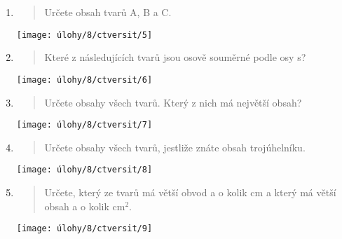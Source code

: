 \begin{enumerate}
\begin{minipage}[t]{\linewidth}
    \end{minipage}

    \item
    \begin{minipage}[t]{\linewidth}
        \begin{quote}
            Určete obsah tvarů A, B a C\@.
        \end{quote}
        \centering
        \texttt{[image: úlohy/8/ctversit/5]}

    \end{minipage}

    \item
    \begin{minipage}[t]{\linewidth}
        \begin{quote}
            Které z následujících tvarů jsou osově souměrné podle osy s?
        \end{quote}
        \centering
        \texttt{[image: úlohy/8/ctversit/6]}

    \end{minipage}

    \item
    \begin{minipage}[t]{\linewidth}
        \begin{quote}
            Určete obsahy všech tvarů.
            Který z nich má největší obsah?
        \end{quote}
        \centering
        \texttt{[image: úlohy/8/ctversit/7]}

    \end{minipage}

    \item
    \begin{minipage}[t]{\linewidth}
        \begin{quote}
            Určete obsahy všech tvarů, jestliže znáte obsah trojúhelníku.
        \end{quote}
        \centering
        \texttt{[image: úlohy/8/ctversit/8]}

    \end{minipage}

    \item
    \begin{minipage}[t]{\linewidth}
        \begin{quote}
            Určete, který ze tvarů má větší obvod a o kolik cm a který má větší obsah a o kolik cm$^{2}$.
        \end{quote}
        \centering
        \texttt{[image: úlohy/8/ctversit/9]}


\end{minipage}
\end{enumerate}
